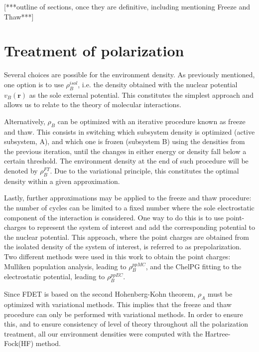 \documentclass[journal=jctcce,manuscript=article, layout=twocolumn]{achemso}
\newcommand{\nr}[1]{\color{red}#1\color{black}}
\begin{document}
\nr{[***outline of sections, once they are definitive, including mentioning Freeze and Thaw***]}

\section{Treatment of polarization} \label{sect:pol_treat}
Several choices are possible for the environment density.\cite{HumbertDroz2014} As previously mentioned, one option is to use $\rho_B^{isol}$, i.e. the density obtained with the nuclear potential $v_B(\mathbf{r})$ as the sole external potential. This constitutes the simplest approach and allows us to relate to the theory of molecular interactions.

Alternatively, $\rho_B$ can be optimized with an iterative procedure known as freeze and thaw. This consists in switching which subsystem density is optimized (active subsystem, A), and which one is frozen (subsystem B) using the densities from the previous iteration, until the changes in either energy or density fall below a certain threshold. The environment density at the end of such procedure will be denoted by $\rho_B^{FT}$. Due to the variational principle, this constitutes the optimal density within a given approximation.

Lastly, further approximations may be applied to the freeze and thaw procedure: the number of cycles can be limited to a fixed number where the sole electrostatic component of the interaction is considered.  One way to do this is to use point-charges to represent the system of interest and add the corresponding potential to the nuclear potential. This approach, where the point charges are obtained from the isolated density of the system of interest, is referred to as prepolarization. Two different methods were used in this work to obtain the point charges: Mulliken population analysis, leading to $\rho_B^{ppMC}$, and the ChelPG fitting to the electrostatic potential, leading to $\rho_B^{ppEC}$. 

Since FDET is based on the second Hohenberg-Kohn theorem, $\rho_A$ must be optimized with variational methods. This implies that the freeze and thaw procedure can only be performed with variational methods. In order to ensure this, and to ensure consistency of level of theory throughout all the polarization treatment, all our environment densities were computed with the Hartree-Fock(HF) method.
 
\end{document}
